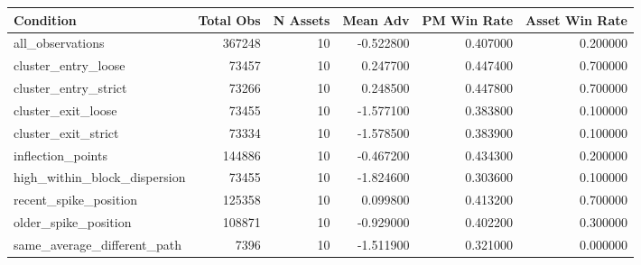 \begin{tabular}{lrrrrr}
\toprule
Condition & Total Obs & N Assets & Mean Adv & PM Win Rate & Asset Win Rate \\
\midrule
all_observations & 367248 & 10 & -0.522800 & 0.407000 & 0.200000 \\
cluster_entry_loose & 73457 & 10 & 0.247700 & 0.447400 & 0.700000 \\
cluster_entry_strict & 73266 & 10 & 0.248500 & 0.447800 & 0.700000 \\
cluster_exit_loose & 73455 & 10 & -1.577100 & 0.383800 & 0.100000 \\
cluster_exit_strict & 73334 & 10 & -1.578500 & 0.383900 & 0.100000 \\
inflection_points & 144886 & 10 & -0.467200 & 0.434300 & 0.200000 \\
high_within_block_dispersion & 73455 & 10 & -1.824600 & 0.303600 & 0.100000 \\
recent_spike_position & 125358 & 10 & 0.099800 & 0.413200 & 0.700000 \\
older_spike_position & 108871 & 10 & -0.929000 & 0.402200 & 0.300000 \\
same_average_different_path & 7396 & 10 & -1.511900 & 0.321000 & 0.000000 \\
\bottomrule
\end{tabular}
